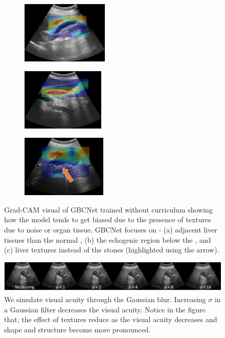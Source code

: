 \begin{figure}[t]
    \centering
    \begin{subfigure}[b]{0.3\linewidth}
		\centering
		\includegraphics[width=\linewidth,height=8em]{figs/gbcnet/texture-1.jpg}
		\caption{}
	\end{subfigure}
    \begin{subfigure}[b]{0.3\linewidth}
		\centering
		\includegraphics[width=\linewidth,height=8em]{figs/gbcnet/texture-2.jpg}
		\caption{}
	\end{subfigure}
	\begin{subfigure}[b]{0.3\linewidth}
		\centering
		\includegraphics[width=\linewidth,height=8em]{figs/gbcnet/texture-3.jpg}
		\caption{}
	\end{subfigure}
    \caption[Visualization of texture bias]{Grad-CAM visual of GBCNet trained without curriculum showing how the model tends to get biased due to the presence of textures due to noise or organ tissue. GBCNet focuses on - (a) adjacent liver tissues than the normal \gb, (b) the echogenic region below the \gb, and (c) liver textures instead of the stones (highlighted using the arrow).}
    \label{fig:texture_bias_sample}
\end{figure}
%
\begin{figure}[t]
	\centering
	\includegraphics[width=0.95\linewidth]{figs/blur_sample_1.png}
	\caption[Gaussian blurring of USG data samples]{We simulate visual acuity through the Gaussian blur. Increasing $\sigma$ in a Gaussian filter decreases the visual acuity. Notice in the figure that, the effect of textures reduce as the visual acuity decreases and \gb shape and structure become more pronounced.}
	\label{fig:vis_acuity_sample}
\end{figure}

